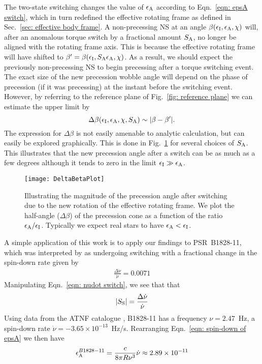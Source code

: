 \documentclass[../full_thesis/full_thesis.tex]{subfiles}
\begin{document}
The two-state switching changes the value of $\epsilon_{\mathrm{A}}$ according to
Eqn.~\eqref{eqn: epsA switch}, which in turn redefined the effective rotating frame
as defined in Sec.~\ref{sec: effective body frame}. A non-precessing NS at an
angle $\beta(\epsilon_{\mathrm{I}}, \epsilon_{\mathrm{A}}, \chi)$ will, after an anomalous torque switch by a fractional
amount $S_{\mathrm{A}}$, no longer be aligned with the rotating frame axis. This is
because the effective rotating frame will have shifted to $\beta' = \beta(\epsilon_{\mathrm{I}},
S_{\mathrm{A}}\epsilon_{\mathrm{A}}, \chi)$. As a result, we should expect the previously
non-precessing NS to begin precessing after a torque switching event.
The exact size of the new precession wobble angle will depend on the phase of
precession (if it was precessing) at the instant before the switching event.
However, by referring to the reference plane of Fig.~\ref{fig: reference plane}
we can estimate the upper limit by
\begin{equation}
    \Delta\beta(\epsilon_{\mathrm{I}}, \epsilon_{\mathrm{A}}, \chi, S_{\mathrm{A}}) \sim |\beta - \beta'|.
\end{equation}
The expression for $\Delta \beta$ is
not easily amenable to analytic calculation, but can easily be explored
graphically.  This is done in Fig.~\ref{fig: DeltaBetaPlot} for several choices
of $S_{\mathrm{A}}$. This illustrates that the new precession angle after a switch can be
as much as a few degrees although it tends to zero in the limit $\epsilon_{\mathrm{I}} \gg
\epsilon_{\mathrm{A}}$.
\begin{figure}[htb]
    \centering
    \texttt{[image: DeltaBetaPlot]}
    \caption{Illustrating the magnitude of the precession angle after switching
        due to the new rotation of the effective rotating frame. We plot the half-angle
        ($\Delta\beta$) of the precession cone as a function of the ratio
    $\epsilon_{\mathrm{A}}/\epsilon_{\mathrm{I}}$. Typically we expect real stars to have $\epsilon_{\mathrm{A}} < \epsilon_{\mathrm{I}}$.}
    \label{fig: DeltaBetaPlot}
\end{figure}

A simple application of this work is to apply our findings to PSR~B1828-11,
which was interpreted by \citet{Lyne2010} as undergoing switching with a fractional
change in the spin-down rate given by
\begin{align}
\frac{\Delta\dot{\nu}}{\dot{\nu}} = 0.0071
\end{align}
Manipulating Eqn.~\eqref{eqn: nudot switch}, we see that that
\begin{align}
|S_{\mathrm{S}}| = \frac{\Delta\dot{\nu}}{\dot{\nu}}
\end{align}
Using data from the ATNF catalogue \citep{ATNF}, B1828-11 has a frequency
$\nu = 2.47$~Hz, a spin-down rate $\dot{\nu}=-3.65\times10^{-13}$~Hz/s.
Rearranging Eqn.~\ref{eqn: spin-down of epsA} we then have
\begin{align}
\epsilon_{\mathrm{A}}^{B1828-11} = \frac{c}{8\pi R\nu^{3}}\dot{\nu} \approx 2.89 \times 10^{-11}
\end{align}
\end{document}

